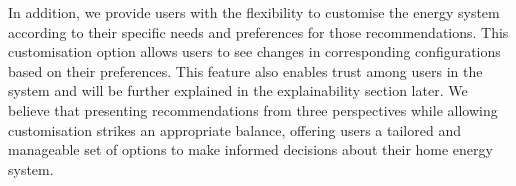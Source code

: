 In addition, we provide users with the flexibility to customise the energy system according to their specific needs and preferences for those recommendations. 
This customisation option allows users to see changes in corresponding configurations based on their preferences. 
This feature also enables trust among users in the system and will be further explained in the explainability section later. 
We believe that presenting recommendations from three perspectives while allowing customisation strikes an appropriate balance, offering users a tailored and manageable set of options to make informed decisions about their home energy system.

%

%


